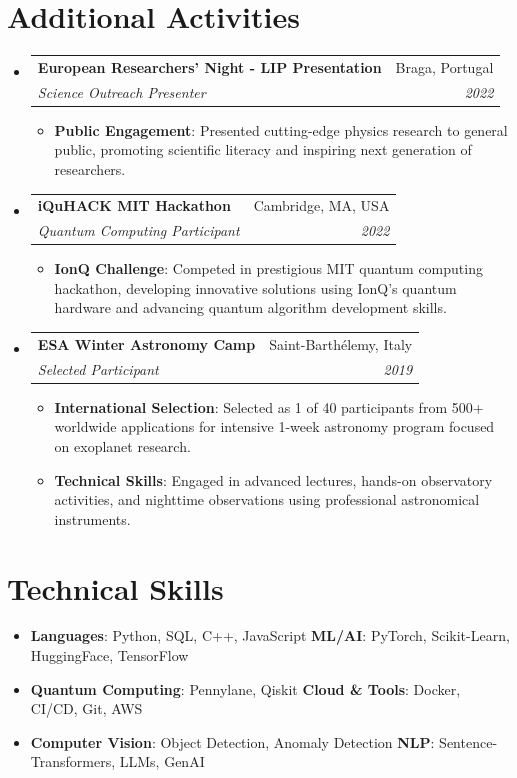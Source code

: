 \documentclass[letterpaper,11pt]{article}
\makeatletter
\newcommand{\resumeItem}[2]{
  \item\small{
    \textbf{#1}{: #2 \vspace{-2pt}}
  }
}
\newcommand{\resumeSubheading}[4]{
  \vspace{-1pt}\item
    \begin{tabular*}{0.97\textwidth}[t]{l@{\extracolsep{\fill}}r}
      \textbf{#1} & #2 \\
      \textit{\small#3} & \textit{\small #4} \\
    \end{tabular*}\vspace{-5pt}
}
\newcommand{\resumeSubHeadingListStart}{\begin{itemize}[leftmargin=*]}
\newcommand{\resumeSubHeadingListEnd}{\end{itemize}}
\newcommand{\resumeItemListStart}{\begin{itemize}}
\newcommand{\resumeItemListEnd}{\end{itemize}\vspace{-5pt}}
\makeatother
\begin{document}
\section{Additional Activities}
  \resumeSubHeadingListStart
    \resumeSubheading
      {European Researchers' Night - LIP Presentation}{Braga, Portugal}
      {Science Outreach Presenter}{2022}
      \resumeItemListStart
        \resumeItem{Public Engagement}
          {Presented cutting-edge physics research to general public, promoting scientific literacy and inspiring next generation of researchers.}
      \resumeItemListEnd

    \resumeSubheading
      {iQuHACK MIT Hackathon}{Cambridge, MA, USA}
      {Quantum Computing Participant}{2022}
      \resumeItemListStart
        \resumeItem{IonQ Challenge}
          {Competed in prestigious MIT quantum computing hackathon, developing innovative solutions using IonQ's quantum hardware and advancing quantum algorithm development skills.}
      \resumeItemListEnd

    \resumeSubheading
      {ESA Winter Astronomy Camp}{Saint-Barthélemy, Italy}
      {Selected Participant}{2019}
      \resumeItemListStart
        \resumeItem{International Selection}
          {Selected as 1 of 40 participants from 500+ worldwide applications for intensive 1-week astronomy program focused on exoplanet research.}
        \resumeItem{Technical Skills}
          {Engaged in advanced lectures, hands-on observatory activities, and nighttime observations using professional astronomical instruments.}
      \resumeItemListEnd
  \resumeSubHeadingListEnd

\section{Technical Skills}
  \resumeSubHeadingListStart
    \item{
      \textbf{Languages}{: Python, SQL, C++, JavaScript}
      \hfill
      \textbf{ML/AI}{: PyTorch, Scikit-Learn, HuggingFace, TensorFlow}
    }
    \item{
      \textbf{Quantum Computing}{: Pennylane, Qiskit}
      \hfill
      \textbf{Cloud \& Tools}{: Docker, CI/CD, Git, AWS}
    }
    \item{
      \textbf{Computer Vision}{: Object Detection, Anomaly Detection}
      \hfill
      \textbf{NLP}{: Sentence-Transformers, LLMs, GenAI}
    }
  \resumeSubHeadingListEnd
\end{document}
